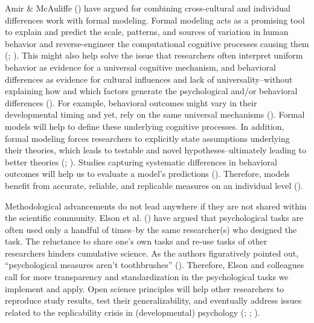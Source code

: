 \documentclass[
]{scrbook}
\begin{document}
Amir \& McAuliffe () have argued for combining cross-cultural and individual differences work with formal modeling. Formal modeling acts as a promising tool to explain and predict the scale, patterns, and sources of variation in human behavior and reverse-engineer the computational cognitive processes causing them (; ). This might also help solve the issue that researchers often interpret uniform behavior as evidence for a universal cognitive mechanism, and behavioral differences as evidence for cultural influences and lack of universality\thinspace --\thinspace without explaining how and which factors generate the psychological and/or behavioral differences (). For example, behavioral outcomes might vary in their developmental timing and yet, rely on the same universal mechanisms (). Formal models will help to define these underlying cognitive processes. In addition, formal modeling forces researchers to explicitly state assumptions underlying their theories, which leads to testable and novel hypotheses\thinspace --\thinspace ultimately leading to better theories (; ). Studies capturing systematic differences in behavioral outcomes will help us to evaluate a model's predictions (). Therefore, models benefit from accurate, reliable, and replicable measures on an individual level ().

Methodological advancements do not lead anywhere if they are not shared within the scientific community. Elson et al. () have argued that psychological tasks are often used only a handful of times\thinspace --\thinspace by the same researcher(s) who designed the task. The reluctance to share one's own tasks and re-use tasks of other researchers hinders cumulative science. As the authors figuratively pointed out, ``psychological measures aren't toothbrushes'' (). Therefore, Elson and colleagues call for more transparency and standardization in the psychological tasks we implement and apply. Open science principles will help other researchers to reproduce study results, test their generalizability, and eventually address issues related to the replicability crisis in (developmental) psychology (; ; ).
\end{document}
